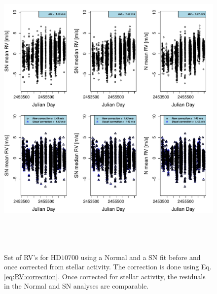 \documentclass{aa}
\begin{document}
\begin{figure} 
   \centering
\includegraphics[height = 6in]{NEW_CORRECTIONHD10700_[3]CorrectionActivity_RadialVelocity_vs_time.pdf} 
   \caption{Set of RV's for $\text{HD}10700$  using a Normal and a SN fit before and once corrected from stellar activity. The correction is done using Eq. \ref{eq:RV:correction}. Once corrected for stellar activity, the residuals in the Normal and SN analyses are comparable.}
   \label{fig:HD10700:correctionRV}
\end{figure}
\end{document}
